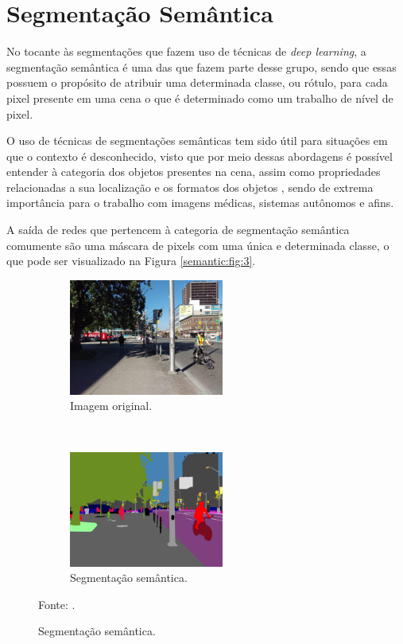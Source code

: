 \clearpage
\newpage


\section{Segmentação Semântica}
\label{semantic}
No tocante às segmentações que fazem uso de técnicas de \textit{deep learning}, a segmentação semântica é uma das que fazem parte desse grupo, sendo que essas possuem o propósito de atribuir uma determinada classe, ou rótulo, para cada pixel presente em uma cena \citep{Wang2017, Ghosh2019, Shelhamer2016, Arbelaez2012,Zhang2018} o que é determinado como um trabalho de nível de pixel.

O uso de técnicas de segmentações semânticas tem sido útil para situações em que o contexto é desconhecido, visto que por meio dessas abordagens é possível entender à categoria dos objetos presentes na cena, assim como propriedades relacionadas a sua localização e os formatos dos objetos \citep{Zhang2018}, sendo de extrema importância para o trabalho com imagens médicas, sistemas autônomos e afins.

A saída de redes que pertencem à categoria de segmentação semântica comumente são uma máscara de 
pixels com uma única e determinada classe, o que pode ser visualizado na Figura \ref{semantic:fig:3}.

\begin{figure}[H]
   \caption{Segmentação semântica.}
   \centering
   \label{semantic:fig:3}
    \begin{subfigure}[t]{0.45\textwidth}
        \centering
        \includegraphics[height=1.5in]{recursos/imagens/semantic/t1.jpg}
        \caption{Imagem original.}
        \label{semantic:fig:3.1}
    \end{subfigure}%
    ~ 
    \begin{subfigure}[t]{0.45\textwidth}
        \centering
        \includegraphics[height=1.5in]{recursos/imagens/semantic/s1.png}
        \caption{Segmentação semântica.}
        \label{semantic:fig:3.2}
    \end{subfigure}%

    Fonte: \cite{Neuhold2017_ICCV}.
\end{figure}

